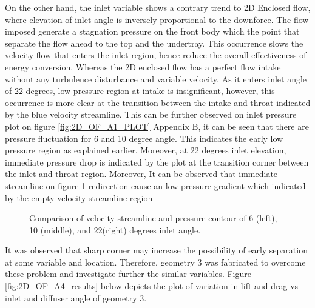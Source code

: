 \noindent On the other hand, the inlet variable shows a contrary trend  to 2D Enclosed flow, where elevation of inlet angle is inversely proportional to the downforce. The flow imposed generate a stagnation pressure on the front body which the point that separate the flow ahead to the top and the undertray. This occurrence slows the velocity flow that enters the inlet region, hence reduce the overall effectiveness of energy conversion. Whereas the 2D enclosed flow has a perfect flow intake without any turbulence disturbance and variable velocity. As it enters inlet angle of 22 degrees, low pressure region at intake is insignificant, however, this occurrence is more clear at the transition between the intake and throat indicated by the blue velocity streamline. This can be further observed on inlet pressure plot on figure \ref{fig:2D_OF_A1_PLOT} Appendix B, it can be seen that there are pressure fluctuation for 6 and 10 degree angle. This indicates the early low pressure region as explained earlier. Moreover, at 22 degrees inlet elevation, immediate pressure drop is indicated by the plot at the transition corner between the inlet and throat region. Moreover,  It can be observed that immediate streamline on figure \ref{fig:A1_Contour_inlet_compare} redirection cause an low pressure gradient which indicated by the empty velocity streamline region 

\begin{figure}[!hb]
   \noindent{}
   \caption{Comparison of velocity streamline and pressure contour of 6 (left), 10 (middle), and 22(right) degrees inlet angle. }
   \label{fig:A1_Contour_inlet_compare}
\end{figure}

\noindent It was observed that sharp corner may increase the possibility of early separation at some variable and location. Therefore, geometry 3 was fabricated to overcome these problem and investigate further the similar variables. Figure \ref{fig:2D_OF_A4_results} below depicts the plot of variation in lift and drag vs inlet and diffuser angle of geometry 3.

